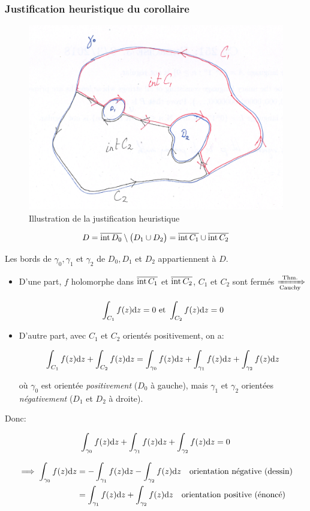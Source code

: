 \subsubsection*{Justification heuristique du corollaire}

\begin{figure}[h]
    \centering
    \includegraphics[width=.65\linewidth]{img/3_2_4-heur.png}
    \caption{Illustration de la justification heuristique}
    \label{3_2_4-heur}
\end{figure}

\[
D = \overline{\textrm{int}\, D_0} \setminus \big(D_1 \cup D_2\big) = \overline{\textrm{int}\, C_1} \cup \overline{\textrm{int}\, C_2}
\]

Les bords de $\gamma_0, \gamma_1$ et $\gamma_2$ de $D_0,D_1$ et $D_2$ appartiennent à $D$.

\begin{itemize}
    \item 
    D'une part, $f$ holomorphe dans $\overline{\textrm{int}\, C_1}$ et $\overline{\textrm{int}\, C_2}$, $C_1$ et $C_2$ sont fermés $\xRightarrow[\textrm{Cauchy}]{\textrm{Thm.}}$
    
    \[\int_{C_1} f(z) \mathrm{d}z = 0 \textrm{ et } \int_{C_2} f(z) \mathrm{d}z = 0\]
    \item 
    D'autre part, avec $C_1$ et $C_2$ orientés positivement, on a:
    
    \[
    \int_{C_1} f(z) \mathrm{d}z + \int_{C_2} f(z) \mathrm{d}z = \int_{\gamma_0} f(z) \mathrm{d}z + \int_{\gamma_1} f(z) \mathrm{d}z + \int_{\gamma_2} f(z) \mathrm{d}z
    \]
    
    où $\gamma_0$ est orientée \textit{positivement} ($D_0$ à gauche), mais $\gamma_1$ et $\gamma_2$ orientées \textit{négativement} ($D_1$ et $D_2$ à droite).
\end{itemize}

Donc:

\[\int_{\gamma_0} f(z) \mathrm{d}z + \int_{\gamma_1} f(z) \mathrm{d}z + \int_{\gamma_2} f(z) \mathrm{d}z = 0\]

\begin{align*}
\implies \int_{\gamma_0} f(z) \mathrm{d}z &= - \int_{\gamma_1} f(z) \mathrm{d}z - \int_{\gamma_2} f(z) \mathrm{d}z \quad \textrm{orientation négative (dessin)}\\
&= \int_{\gamma_1} f(z) \mathrm{d}z + \int_{\gamma_2} f(z) \mathrm{d}z \quad \textrm{orientation positive (énoncé)}
\end{align*}


